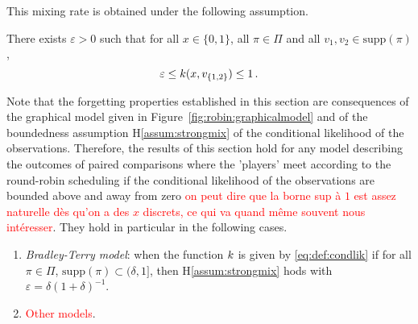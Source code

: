 This mixing rate is obtained under the following assumption.
\begin{hypH}
\label{assum:strongmix}
There exists $\varepsilon>0$ such that for all $x\in\{0,1\}$, all $\pi\in\Pi$ and all $v_1,v_2 \in \mathrm{supp}(\pi)$ , 
\begin{equation}
\label{eq:bound:likelihood}
\varepsilon\le k(x,v_{\{1,2\}})\le 1\,.
\end{equation}
\end{hypH}
Note that the forgetting properties established in this section are consequences of the graphical model given in Figure~\ref{fig:robin:graphicalmodel} and of the boundedness assumption H\ref{assum:strongmix} of the conditional likelihood of the observations. Therefore, the results of this section hold for any model describing the outcomes of paired comparisons where the 'players' meet according to the round-robin scheduling if the conditional likelihood of the observations are bounded above and away from zero \textcolor{red}{on peut dire que la borne sup à $1$ est assez naturelle dès qu'on a des $x$ discrets, ce qui va quand même souvent nous intéresser}. They hold in particular in the following cases.
\begin{enumerate}[-]
\item {\em Bradley-Terry model}: when the function $k$ is given by \eqref{eq:def:condlik} if for all $\pi \in\Pi$, $\mathrm{supp}(\pi) \subset (\delta,1]$, then H\ref{assum:strongmix} hods with $\varepsilon=\delta(1+\delta)^{-1}$.
\item \textcolor{red}{Other models}.
\end{enumerate}




